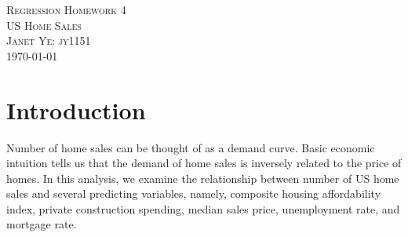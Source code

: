\documentclass[a4 paper, 11 pt]{article}
\begin{document}
\begin{titlepage}
\begin{center}
\textsc{\huge Regression Homework 4} \\ [0.5cm]
\textsc{\huge US Home Sales}\\ [1.5cm]
\textsc{\large Janet Ye: jy1151} \\
\vfill
{\large \today}
\end{center}
\end{titlepage}

\section{Introduction}
Number of home sales can be thought of as a demand curve. Basic economic intuition tells us that the demand of home sales is inversely related to the price of homes. In this analysis, we examine the relationship between number of US home sales and several predicting variables, namely, composite housing affordability index, private construction spending, median sales price, unemployment rate, and mortgage rate.
\end{document}

